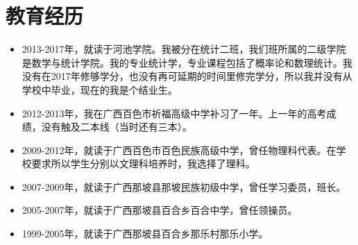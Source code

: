 \section{教育经历}
\begin{itemize}
	\item 2013-2017年，就读于河池学院。我被分在统计二班，我们班所属的二级学院是数学与统计学院。我的专业统计学，专业课程包括了概率论和数理统计。我没有在2017年修够学分，也没有再可延期的时间里修完学分，所以我并没有从学校中毕业，现在的我是个结业生。%
	\item 2012-2013年，我在广西百色市祈福高级中学补习了一年。上一年的高考成绩，没有触及二本线（当时还有三本）。
	\item 2009-2012年，就读于广西百色市百色民族高级中学，曾任物理科代表。在学校要求所以学生分别以文理科培养时，我选择了理科。
	\item 2007-2009年，就读于广西那坡县那坡民族初级中学，曾任学习委员，班长。
	\item 2005-2007年，就读于广西那坡县百合乡百合中学，曾任领操员。
	\item 1999-2005年，就读于广西那坡县百合乡那乐村那乐小学。
\end{itemize}
